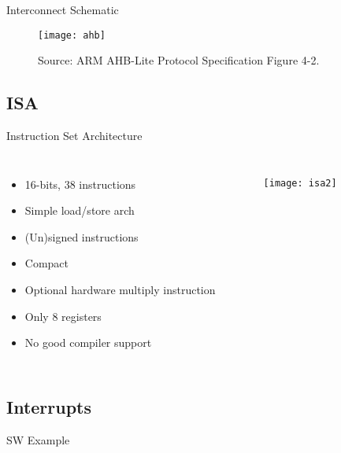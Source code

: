 \documentclass[aspectratio=169]{beamer}
\newcommand\pro{\item[$+$]}
\newcommand\con{\item[$-$]}
\begin{document}
\begin{frame}{Interconnect Schematic}
    \begin{figure}
        \centering
        \texttt{[image: ahb]}
        \caption{Source: ARM AHB-Lite Protocol Specification Figure 4-2.}
        \label{fig:my_label}
    \end{figure}
\end{frame}

\subsection{ISA}
\begin{frame}{Instruction Set Architecture}
    
\begin{columns}[t]
\begin{itemize}
    \pro 16-bits, 38 instructions
    \pro Simple load/store arch
    \pro (Un)signed instructions
    \pro Compact
    \pro Optional hardware multiply instruction\\
    
    \con Only 8 registers
    \con No good compiler support
\end{itemize}
\vspace{-2cm}
\begin{figure}
    \centering
    \texttt{[image: isa2]}
\end{figure}
\end{columns}
\end{frame}

\subsection{Interrupts}
\begin{frame}[c]
\begin{center}
\Huge SW Example
\end{center}
\end{frame}

\iffalse
\begin{frame}[t]{Interrupts}
\begin{columns}[t]
\column{0.5\textwidth}
\begin{figure}
\texttt{[image: rinterrupts]}\\
\vspace{.5cm}
\texttt{[image: rinterruptsmask]}
\end{figure}
\column{0.5\textwidth}
\begin{figure}
\texttt{[image: vinterrupts]}
\end{figure}
\end{columns}
\vspace{1cm}
Demo: 2 Core LED toggle (GPIO0) with TIMR0 1s interrupt (interrupts\_2.s)
\end{frame}
\fi
\end{document}
